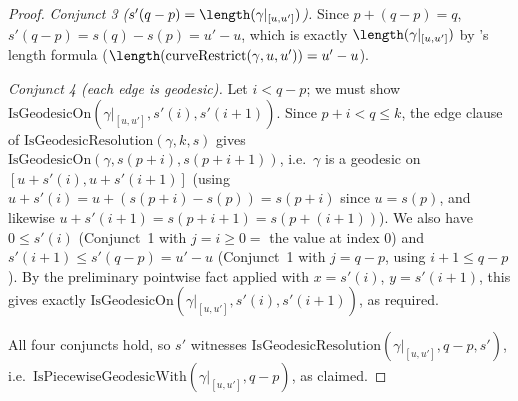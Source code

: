 \begin{proof}
  \emph{Conjunct 3 ($s'(q-p) = \length(\gamma|_{[u,u']})$).} Since $p + (q-p) = q$,
  $s'(q-p) = s(q) - s(p) = u' - u$, which is exactly $\length(\gamma|_{[u,u']})$ by
  's length formula ($\length(\mathrm{curveRestrict}(\gamma,u,u')) = u'-u$).

  \emph{Conjunct 4 (each edge is geodesic).} Let $i < q-p$; we must show
  $\mathrm{IsGeodesicOn}(\gamma|_{[u,u']}, s'(i), s'(i+1))$. Since $p+i < q \le k$, the edge clause
  of $\mathrm{IsGeodesicResolution}(\gamma,k,s)$ gives $\mathrm{IsGeodesicOn}(\gamma, s(p+i),
  s(p+i+1))$, i.e.\ $\gamma$ is a geodesic on $[u+s'(i), u+s'(i+1)]$ (using $u+s'(i) =
  u + (s(p+i)-s(p)) = s(p+i)$ since $u=s(p)$, and likewise $u+s'(i+1) = s(p+i+1) =
  s(p+(i+1))$). We also have $0 \le s'(i)$ (Conjunct~1 with $j=i \ge 0=$ the value at index $0$) and
  $s'(i+1) \le s'(q-p) = u'-u$ (Conjunct~1 with $j=q-p$, using $i+1 \le q-p$). By the preliminary
  pointwise fact applied with $x=s'(i)$, $y=s'(i+1)$, this gives exactly
  $\mathrm{IsGeodesicOn}(\gamma|_{[u,u']}, s'(i), s'(i+1))$, as required.

  All four conjuncts hold, so $s'$ witnesses
  $\mathrm{IsGeodesicResolution}(\gamma|_{[u,u']}, q-p, s')$, i.e.\
  $\mathrm{IsPiecewiseGeodesicWith}(\gamma|_{[u,u']}, q-p)$, as claimed.
\end{proof}
